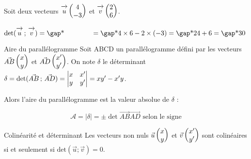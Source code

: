\documentclass[10pt,a4paper,openany,twoside, prof]{book}
\begin{document}
\begin{ex}{}{}
	Soit deux vecteurs $\overrightarrow{\,\mathstrut u\,}\begin{pmatrix}4\\-3\end{pmatrix}$ et $\overrightarrow{\,\mathstrut v\,}\begin{pmatrix}2\\6\end{pmatrix}$.

	$\det{\vecu}{\vecv} = \troum{\quad\quad\quad\quad} = \troum{4\times 6-2\times(-3)} = \troum{24+6} = \troum{30}$
\end{ex}

\begin{propadmise}{Aire du parallélogramme}{}
	Soit ABCD un parallélogramme défini par les vecteurs $\vec{AB}\begin{pmatrix}x\\y\end{pmatrix}$ et $\vec{AD}\begin{pmatrix}x'\\y'\end{pmatrix}$. On note $\delta$ le déterminant $\delta = \text{det}(\vec{AB}\,;\,\vec{AD}) = \begin{vmatrix}x & x' \\ y & y'\end{vmatrix} = xy'-x'y$.

	\begin{minipage}{.6\textwidth}
\end{minipage}
\begin{minipage}{.4\textwidth}Alors l'aire du parallélogramme est la valeur absolue de $\delta$ :

	\medskip
			$$\mathcal{A} = |\delta| = \pm\det{\vec{AB}}{\vec{AD}} \text{ selon le signe}$$
\end{minipage}

\end{propadmise}

\begin{prop}{Colinéarité et déterminant}{}
	Les vecteurs non nuls $\vec{u}\begin{pmatrix}x\\y\end{pmatrix}$ et $\vec{v}\begin{pmatrix}x'\\y'\end{pmatrix}$ sont colinéaires si et seulement si $\text{det}(\vec{u};\vec{v})=0$.
\end{prop}
\end{document}

